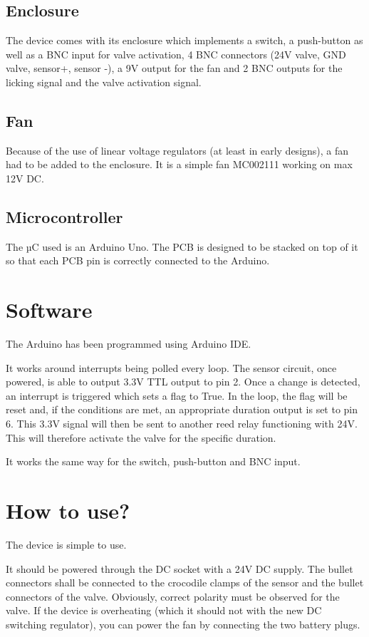 \documentclass[a4paper]{article}
\begin{document}
\subsection{Enclosure}
The device comes with its enclosure which implements a switch, a push-button as well as a BNC input for valve activation, 4 BNC connectors (24V valve, GND valve, sensor+, sensor -), a 9V output for the fan and 2 BNC outputs for the licking signal and the valve activation signal.
\subsection{Fan}
Because of the use of linear voltage regulators (at least in early designs), a fan had to be added to the enclosure. It is a simple fan MC002111 working on max 12V DC.

\subsection{Microcontroller}
The µC used is an Arduino Uno. The PCB is designed to be stacked on top of it so that each PCB pin is correctly connected to the Arduino. 

\section{Software}
The Arduino has been programmed using Arduino IDE. 

It works around interrupts being polled every loop.
The sensor circuit, once powered, is able to output 3.3V TTL output to pin 2. Once a change is detected, an interrupt is triggered which sets a flag to True. In the loop, the flag will be reset and, if the conditions are met, an appropriate duration output is set to pin 6. This 3.3V signal will then be sent to another reed relay functioning with 24V. This will therefore activate the valve for the specific duration.

It works the same way for the switch, push-button and BNC input.

\section{How to use?}
The device is simple to use.

It should be powered through the DC socket with a 24V DC supply. The bullet connectors shall be connected to the crocodile clamps of the sensor and the bullet connectors of the valve. Obviously, correct polarity must be observed for the valve.
If the device is overheating (which it should not with the new DC switching regulator), you can power the fan by connecting the two battery plugs.
\end{document}
